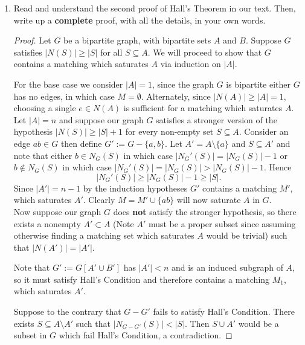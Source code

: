 \documentclass[12pt]{article}
\renewcommand{\emph}[1]{\textsf{\textbf{#1}}}
\begin{document}
\begin{enumerate}
\begin{proof}
	\end{proof}
	\newpage



	\item Read and understand the second proof of Hall's Theorem in our text. Then, write up a \emph{complete} proof, with all the details, in your own words. 
	\begin{proof} Let $G$ be a bipartite graph, with bipartite sets $A$ and $B$. Suppose $G$ satisfies $|N(S)| \geq |S|$ for all $S \subseteq A$. We will proceed to show that $G$ contains a matching which saturates $A$ via induction on $|A|$.  

		For the base case we consider $|A| = 1$, since the graph $G$ is bipartite either $G$ has no edges, in which case $M = \emptyset$. Alternately, since $|N(A)| \geq |A| = 1$, choosing a single $e \in N(A)$ is sufficient for a matching which saturates $A$.\\


		Let $|A| = n$ and suppose our graph $G$ satisfies a stronger version of the hypothesis $|N(S)| \geq |S| + 1$ for every non-empty set $S \subseteq A$. Consider an edge $ab \in G$ then define $G' := G - \{a, b\}$. Let $A' = A \setminus \{a\}$ and $S \subseteq A'$ and note that either $b \in N_G(S)$ in which case $|N_G'(S)| = |N_G(S)| - 1$ or $b \not\in N_G(S)$ in which case $|N_G'(S)| = |N_G(S)| > |N_G(S)| - 1$. Hence 
		\begin{equation*}
			|N_G'(S)| \geq |N_G(S)| - 1 \geq |S|. 
		\end{equation*} 
		Since $|A'| = n - 1$ by the induction hypotheses $G'$ contains a matching $M'$, which saturates $A'$.
		Clearly $M = M' \cup \{ab\}$ will now saturate $A$ in $G$. \\

		
		
		Now suppose our graph $G$ does \emph{not} satisfy the stronger hypothesis, so there exists a nonempty $A' \subset A$ (Note $A'$ must be a proper subset since assuming otherwise finding a matching set which saturates $A$ would be trivial) such that $|N(A')| = |A'|$. 
		
		Note that $G':=G[A' \cup B']$ has $|A'| < n$ and is an induced subgraph of $A$, so it must satisfy Hall's Condition and therefore contains a matching $M_1$, which saturates $A'$. 
		
		
		Suppose to the contrary that $G - G'$ fails to satisfy Hall's Condition. There exists $S \subseteq A \setminus A'$ such that $|N_{G - G'}(S)| < |S|$. Then $S \cup A'$ would be a subset in $G$ which fail Hall's Condition, a contradiction. 
		

\end{proof}
\end{enumerate}
\end{document}
